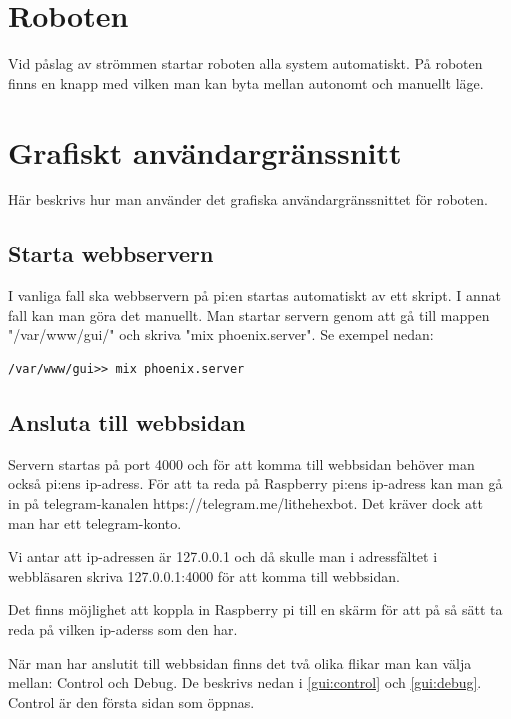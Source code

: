 \documentclass[a4paper,titlepage,12pt]{article}
\begin{document}
	\section{Roboten}
    Vid påslag av strömmen startar roboten alla system automatiskt.
    På roboten finns en knapp med vilken man kan byta mellan autonomt och
    manuellt läge.

	

	\section{Grafiskt användargränssnitt}
	Här beskrivs hur man använder det grafiska användargränssnittet för roboten.
	
	\subsection{Starta webbservern}
    I vanliga fall ska webbservern på pi:en startas automatiskt av ett skript.
    I annat fall kan man göra det manuellt.
	Man startar servern genom att gå till mappen "/var/www/gui/" och skriva "mix
    phoenix.server". Se exempel nedan:
	
	\begin{lstlisting}[style=linux]
	/var/www/gui>> mix phoenix.server
	\end{lstlisting}
	
	\subsection{Ansluta till webbsidan}
	Servern startas på port 4000 och för att komma till webbsidan behöver man
    också pi:ens ip-adress. För att ta reda på Raspberry pi:ens ip-adress kan man gå in
    på telegram-kanalen https://telegram.me/lithehexbot. Det kräver dock att
    man har ett telegram-konto.
	
	Vi antar att ip-adressen är 127.0.0.1 och då skulle man i adressfältet i
    webbläsaren skriva 127.0.0.1:4000 för att komma till webbsidan.
    
    Det finns möjlighet att koppla in Raspberry pi till en skärm för att på så sätt ta reda på 
    vilken ip-aderss som den har. 
	
	När man har anslutit till webbsidan finns det två olika flikar man kan välja
    mellan: Control och Debug. De beskrivs nedan i \ref{gui:control} och
    \ref{gui:debug}. Control är den första sidan som öppnas.
    \newpage
	
\end{document}
